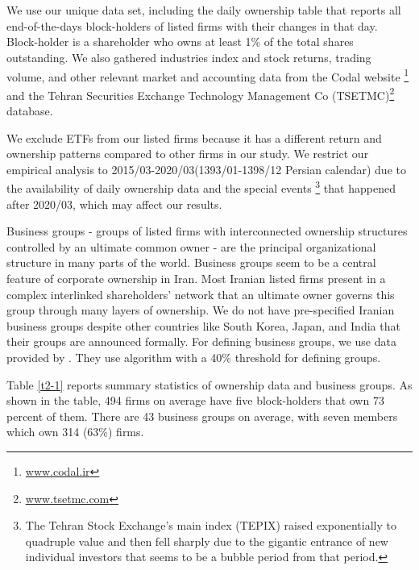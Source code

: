 
\section{}



\subsection{}
\begin{LTR}

We  use our unique data set, including the daily ownership table that reports all end-of-the-days block-holders of listed firms with their changes in that day.  Block-holder is a shareholder who owns at least 1\% of the total shares outstanding. 
	We also gathered industries index and stock returns, trading volume, and other relevant market and accounting data from the Codal website \footnote{\href{http://www.codal.ir}{www.codal.ir}}
and the  Tehran Securities Exchange Technology Management Co (TSETMC)\footnote{\href{http://www.tsetmc.com}{www.tsetmc.com}} database.

We exclude ETFs from our listed firms because it has a different return and ownership patterns compared to other firms in our study.
We restrict our empirical analysis to 2015/03-2020/03(1393/01-1398/12 Persian calendar) due to the availability of daily ownership data and the special events \footnote{
	The Tehran Stock Exchange's main index (TEPIX) raised exponentially to quadruple value and then fell sharply due to the gigantic entrance of new individual investors that seems to be a bubble period from that period.} that happened after 2020/03, which may affect our results. 

Business groups - groups of listed firms with interconnected ownership structures controlled by an ultimate common owner - are the principal organizational structure in many parts of the world.
Business groups seem to be a central feature of corporate ownership in Iran. 
Most Iranian listed firms present in a complex interlinked shareholders' network that an ultimate owner governs this group through many layers of ownership.{\cite{Aliabadi2022}}  
We do not have pre-specified Iranian business groups despite other countries like South Korea, Japan, and India that their groups are announced formally.
For defining business groups, we use data provided by {\cite{Aliabadi2022}}.
They use \cite{almeida2011structure} algorithm with a 40\% threshold for defining groups. 


Table \ref{t2-1} reports summary statistics of ownership data and business groups. As shown in the table, 494 firms on average have five block-holders that own 73 percent of them. There are 43 business groups on average, with seven members which own 314 (63\%) firms. 

\end{LTR}
